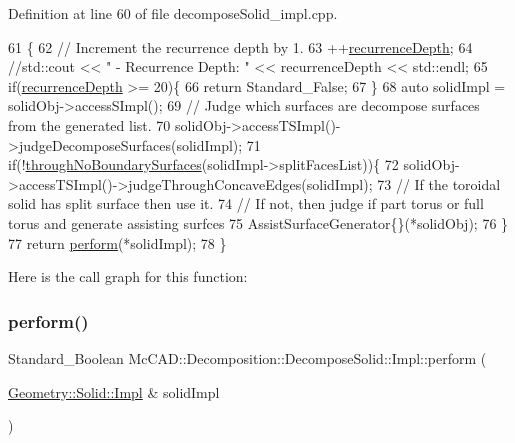 Definition at line 60 of file decompose\+Solid\+\_\+impl.\+cpp.


\begin{DoxyCode}
61                                                   \{
62     \textcolor{comment}{// Increment the recurrence depth by 1.}
63     ++\hyperlink{classMcCAD_1_1Decomposition_1_1DecomposeSolid_1_1Impl_ad908b2687b52f636d8368b814aa5f770}{recurrenceDepth};
64     \textcolor{comment}{//std::cout << "     - Recurrence Depth: " << recurrenceDepth << std::endl;}
65     \textcolor{keywordflow}{if}(\hyperlink{classMcCAD_1_1Decomposition_1_1DecomposeSolid_1_1Impl_ad908b2687b52f636d8368b814aa5f770}{recurrenceDepth} >= 20)\{
66         \textcolor{keywordflow}{return} Standard\_False;
67     \}
68     \textcolor{keyword}{auto} solidImpl = solidObj->accessSImpl();
69     \textcolor{comment}{// Judge which surfaces are decompose surfaces from the generated list.}
70     solidObj->accessTSImpl()->judgeDecomposeSurfaces(solidImpl);
71     \textcolor{keywordflow}{if}(!\hyperlink{classMcCAD_1_1Decomposition_1_1DecomposeSolid_1_1Impl_aade70e5860e8ee29ff8f9e4c4cfc53b9}{throughNoBoundarySurfaces}(solidImpl->splitFacesList))\{
72         solidObj->accessTSImpl()->judgeThroughConcaveEdges(solidImpl);
73         \textcolor{comment}{// If the toroidal solid has split surface then use it.}
74         \textcolor{comment}{// If not, then judge if part torus or full torus and generate assisting surfces}
75         AssistSurfaceGenerator\{\}(*solidObj);
76     \}
77     \textcolor{keywordflow}{return} \hyperlink{classMcCAD_1_1Decomposition_1_1DecomposeSolid_1_1Impl_aa65d0c829adf71764f3d1954cd8d6829}{perform}(*solidImpl);
78 \}
\end{DoxyCode}
Here is the call graph for this function\+:
\mbox{\label{classMcCAD_1_1Decomposition_1_1DecomposeSolid_1_1Impl_aa65d0c829adf71764f3d1954cd8d6829}} 
\subsubsection{\texorpdfstring{perform()}{perform()}\hspace{0.1cm}{\footnotesize\ttfamily [1/2]}}
{\footnotesize\ttfamily Standard\+\_\+\+Boolean Mc\+C\+A\+D\+::\+Decomposition\+::\+Decompose\+Solid\+::\+Impl\+::perform (\begin{DoxyParamCaption}\item[{\hyperlink{classMcCAD_1_1Geometry_1_1Solid_1_1Impl}{Geometry\+::\+Solid\+::\+Impl} \&}]{solid\+Impl }\end{DoxyParamCaption})}



